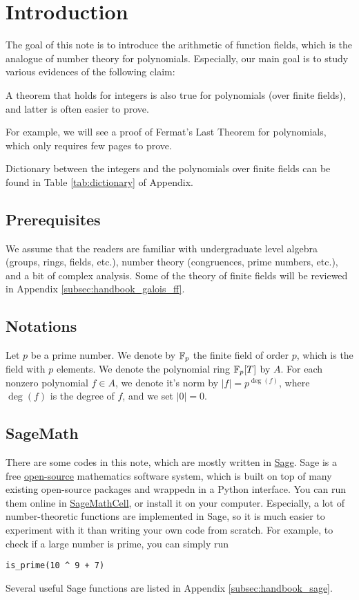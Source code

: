 \section{Introduction}
\label{sec:intro}

The goal of this note is to introduce the arithmetic of function fields, which is the analogue of number theory for polynomials.
Especially, our main goal is to study various evidences of the following claim:

\begin{myquote}
A theorem that holds for integers is also true for polynomials (over finite fields), and latter is often easier to prove.
\end{myquote}
For example, we will see a proof of Fermat's Last Theorem for polynomials, which only requires few pages to prove.

Dictionary between the integers and the polynomials over finite fields can be found in Table \ref{tab:dictionary} of Appendix.

\subsection{Prerequisites}
We assume that the readers are familiar with undergraduate level algebra (groups, rings, fields, etc.), number theory (congruences, prime numbers, etc.), and a bit of complex analysis.
Some of the theory of finite fields will be reviewed in Appendix \ref{subsec:handbook_galois_ff}.


\subsection{Notations}

Let $p$ be a prime number. We denote by $\mathbb{F}_p$ the finite field of order $p$, which is the field with $p$ elements.
We denote the polynomial ring $\mathbb{F}_p[T]$ by $A$.
For each nonzero polynomial $f \in A$, we denote it's norm by $|f| = p^{\deg (f)}$, where $\deg (f)$ is the degree of $f$, and we set $|0| = 0$.

\subsection{SageMath}

There are some codes in this note, which are mostly written in \href{https://www.sagemath.org/}{Sage}.
Sage is a free \href{https://github.com/sagemath/sage}{open-source} mathematics software system, which is built on top of many existing open-source packages and wrappedn in a Python interface.
You can run them online in \href{https://sagecell.sagemath.org/}{SageMathCell}, or install it on your computer.
Especially, a lot of number-theoretic functions are implemented in Sage, so it is much easier to experiment with it than writing your own code from scratch.
For example, to check if a large number is prime, you can simply run
\begin{verbatim}
is_prime(10 ^ 9 + 7)
\end{verbatim}
Several useful Sage functions are listed in Appendix \ref{subsec:handbook_sage}.


